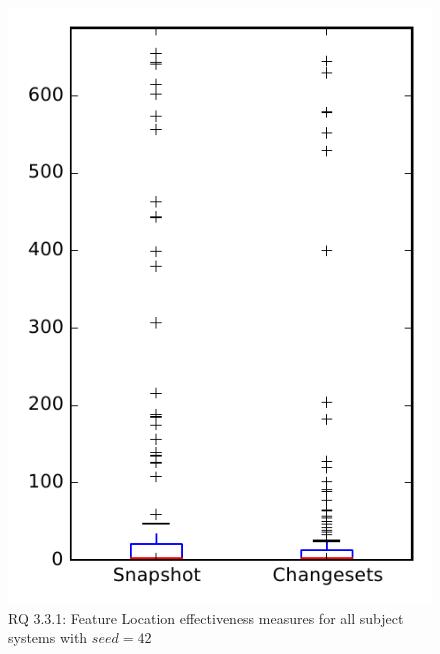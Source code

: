 
\begin{figure}
\centering
\includegraphics[height=0.4\textheight]{figures/flt_seed/rq1_overview_42}
\caption{RQ 3.3.1: Feature Location effectiveness measures for all subject systems with $seed=42$}
\label{fig:flt_seed:rq1:overview}
\end{figure}
